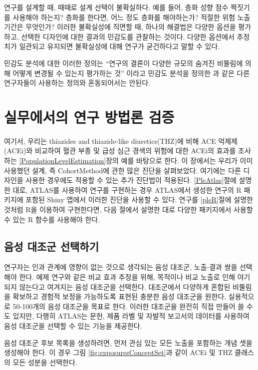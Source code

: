 \documentclass[10.5pt]{book}
\theoremstyle{definition}
\theoremstyle{definition}
\theoremstyle{definition}
\theoremstyle{remark}
\begin{document}
연구를 설계할 때, 때때로 설계 선택이 불확실하다. 예를 들어, 층화 성향
점수 짝짓기를 사용해야 하는지? 층화를 한다면, 어느 정도 층화를
해야하는가? 적절한 위험 노출 기간은 무엇인가? 이러한 불확실성에 직면할
때, 하나의 해결법은 다양한 옵션을 평가하고, 선택한 디자인에 대한 결과의
민감도를 관찰하는 것이다. 다양한 옵션에서 추정치가 일관되고 유지되면
불확실성에 대해 연구가 굳건하다고 말할 수 있다.

민감도 분석에 대한 이러한 정의는 ``연구의 결론이 다양한 규모의 숨겨진
비뚤림에 의해 어떻게 변경될 수 있는지 평가하는 것'' 이라고 민감도 분석을
정의한 \citet{rosenbaum_2005} 과 같은 다른 연구자들이 사용하는 정의와
혼동되어서는 안된다.

\section{실무에서의 연구 방법론 검증}\label{---}

여기서, 우리는 thiazides and thiazide-like diuretics(THZ)에 비해 ACE
억제제(ACEi)와 비교하여 혈관 부종 및 급성 심근 경색의 위험에 대한 ACEi의
효과를 조사하는 \ref{PopulationLevelEstimation}장의 예를 바탕으로 한다.
이 장에서는 우리가 이미 사용했던 설계, 즉 CohortMethod에 관한 많은
진단을 살펴보았다. 여기에는 다른 디자인을 사용한 경우에도 적용할 수 있는
추가 진단법이 적용된다. \ref{PleAtlas}절에 설명한 대로, ATLAS를 사용하여
연구를 구현하는 경우 ATLAS에서 생성한 연구의 R 패키지에 포함된 Shiny
앱에서 이러한 진단을 사용할 수 있다. 연구를 \ref{pleR}절에 설명한 것처럼
R을 이용하여 구현한다면, 다음 절에서 설명한 대로 다양한 패키지에서
사용할 수 있는 R 함수를 사용해야 한다.

\subsection{음성 대조군 선택하기}\label{--}

연구자는 인과 관계에 영향이 없는 것으로 생각되는 음성 대조군, 노출-결과
쌍을 선택해야 한다. 예제 연구와 같은 비교 효과 추정을 위해, 목적이나
비교 노출로 인해 야기되지 않는다고 여겨지는 음성 대조군을 선택한다.
대조군에서 다양하게 혼합된 비뚤림을 확보하고 경험적 보정을 가능하도록
표현된 충분한 음성 대조군을 원한다. 실용적으로 50-100개의 음성 대조군을
목표로 한다. 이러한 대조군을 완전히 직접 만들어 쓸 수도 있지만, 다행히
ATLAS는 문헌, 제품 라벨 및 자발적 보고서의 데이터를 사용하여 음성
대조군을 선택할 수 있는 기능을 제공한다.

음성 대조군 후보 목록을 생성하려면, 먼저 관심 있는 모든 노출을 포함하는
개념 셋을 생성해야 한다. 이 경우 그림 \ref{fig:exposuresConceptSet}과
같이 ACEi 및 THZ 클래스의 모든 성분을 선택한다.
\end{document}
